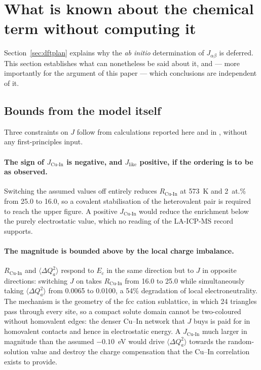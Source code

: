 \documentclass[11pt,a4paper]{article}
\newcommand{\dQ}{\Delta Q}
\newcommand{\RCuIn}{R_{\mathrm{Cu\text{-}In}}}
\newcommand{\JCuIn}{J_{\mathrm{Cu\text{-}In}}}
\newcommand{\Jlike}{J_{\mathrm{like}}}
\begin{document}
\section{What is known about the chemical term without computing it}
\label{sec:dft}

Section~\ref{sec:dftplan} explains why the \textit{ab initio} determination of
$J_{\alpha\beta}$ is deferred. This section establishes what can nonetheless be
said about it, and --- more importantly for the argument of this paper --- which
conclusions are independent of it.

\subsection{Bounds from the model itself}

Three constraints on $J$ follow from calculations reported here and in
\citet{yu2026}, without any first-principles input.

\paragraph{The sign of $\JCuIn$ is negative, and $\Jlike$ positive, if the
ordering is to be as observed.} Switching the assumed values off entirely
reduces $\RCuIn$ at 573~K and 2~at.\% from 25.0 to 16.0, so a covalent
stabilisation of the heterovalent pair is required to reach the upper figure. A
positive $\JCuIn$ would reduce the enrichment below the purely electrostatic
value, which no reading of the LA-ICP-MS record supports.

\paragraph{The magnitude is bounded above by the local charge imbalance.}
$\RCuIn$ and $\langle\dQ_a^2\rangle$ respond to $E_c$ in the same direction but
to $J$ in opposite directions: switching $J$ on takes $\RCuIn$ from 16.0 to
25.0 while simultaneously taking $\langle\dQ_a^2\rangle$ from 0.0065 to 0.0100,
a 54\% degradation of local electroneutrality. The mechanism is the geometry of
the fcc cation sublattice, in which 24 triangles pass through every site, so a
compact solute domain cannot be two-coloured without homovalent edges: the
denser Cu--In network that $J$ buys is paid for in homovalent contacts and hence
in electrostatic energy. A $\JCuIn$ much larger in magnitude than the assumed
$-0.10$~eV would drive $\langle\dQ_a^2\rangle$ towards the random-solution value
and destroy the charge compensation that the Cu--In correlation exists to
provide.
\end{document}
